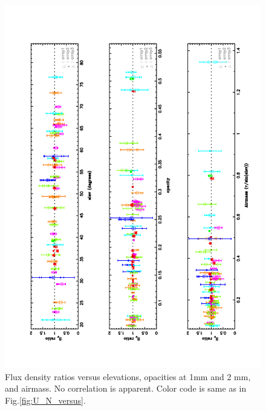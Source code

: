 \begin{figure}
  \includegraphics[clip, angle=-90, scale=0.6]{Figures/ratio_versus_all.pdf}
  \caption{Flux density ratios versus elevations, opacities at 1mm and 2 mm, and airmass. No correlation is
    apparent. Color code is same as in Fig.\ref{fig:U_N_versus}. }
\label{fig:versus_all}
\end{figure}

